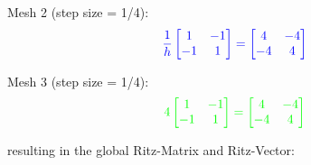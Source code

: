 Mesh 2 (step size = 1/4):
\begin{align*}
    {\color{blue}
    \frac{1}{h}\begin{bmatrix}
        1 & -1 \\
        -1 & 1
    \end{bmatrix}
    =
    \begin{bmatrix}
        4 & -4 \\
        -4 & 4
    \end{bmatrix}
    }
\end{align*}

Mesh 3 (step size = 1/4):
\begin{align*}
    {\color{green}
    4\begin{bmatrix}
        1 & -1 \\
        -1 & 1
    \end{bmatrix}
    =
    \begin{bmatrix}
        4 & -4 \\
        -4 & 4
    \end{bmatrix}
    }
\end{align*}

resulting in the global Ritz-Matrix and Ritz-Vector:

